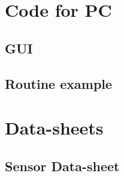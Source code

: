 \documentclass[12pt,a4paper, twoside]{article}
\begin{document}
\section{Code for PC}
\subsection{GUI}

\subsection{Routine example}

\section{Data-sheets}
\subsection{Sensor Data-sheet }\label{app:PMW3660}

%
\end{document}
